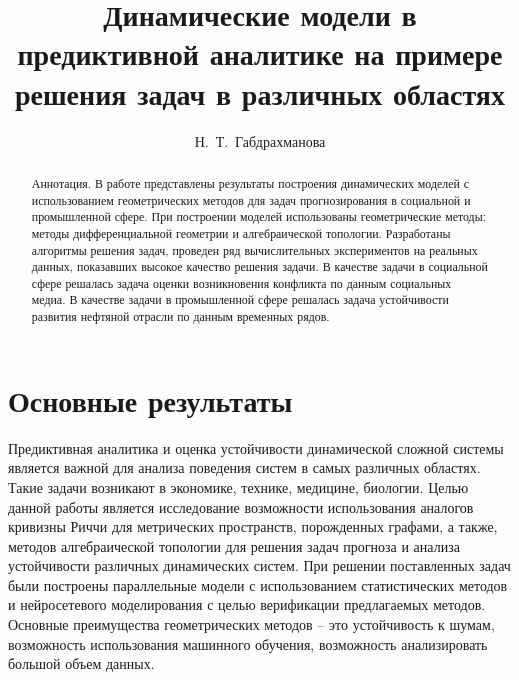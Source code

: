 \usepackage{todonotes}

\usepackage[russian]{nla}


\fi

\title{Динамические модели в предиктивной аналитике на примере решения задач в различных областях}
\author{Н.~Т.~Габдрахманова
}

\institute{РУДН им. Патриса Лумумбы, Москва, РФ \\
 \email{gabdrakhmanova-nt@rudn.ru}
}

\maketitle

\begin{abstract}
Аннотация.  В работе представлены результаты построения динамических моделей с использованием геометрических методов для задач прогнозирования в социальной и промышленной сфере. При построении моделей использованы геометрические методы: методы дифференциальной геометрии и алгебраической топологии. Разработаны алгоритмы решения задач, проведен ряд вычислительных экспериментов на реальных данных, показавших высокое качество решения задачи. В качестве задачи в социальной сфере решалась задача оценки возникновения конфликта по данным социальных медиа. В качестве задачи в промышленной сфере решалась задача устойчивости развития нефтяной отрасли по данным временных рядов.

\end{abstract}

\section{Основные результаты} %

Предиктивная аналитика и оценка устойчивости динамической сложной системы является важной для анализа поведения систем в самых различных областях. Такие задачи возникают в экономике, технике, медицине, биологии. Целью данной работы является исследование возможности использования аналогов кривизны Риччи для метрических пространств, порожденных графами, а также, методов алгебраической топологии для решения задач прогноза и анализа устойчивости различных динамических систем. При решении поставленных задач были построены параллельные модели с использованием статистических методов и нейросетевого моделирования с целью верификации предлагаемых методов. Основные преимущества геометрических методов – это устойчивость к шумам, возможность использования машинного обучения, возможность анализировать большой объем данных.

